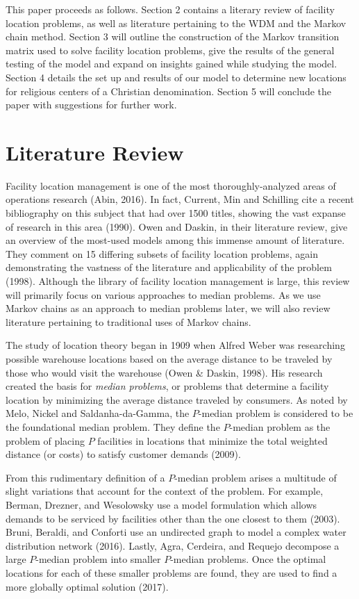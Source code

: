 \documentclass[twoside,twocolumn]{article}
\begin{document}
This paper proceeds as follows.
Section 2 contains a literary review of facility location problems, as well as literature pertaining to the WDM and the Markov chain method.
Section 3 will outline the construction of the Markov transition matrix used to solve facility location problems, give the results of the general testing of the model and expand on insights gained while studying the model.
Section 4 details the set up and results of our model to determine new locations for religious centers of a Christian denomination.
Section 5 will conclude the paper with suggestions for further work.

\section{Literature Review}

Facility location management is one of the most thoroughly-analyzed areas of operations research (Abin, 2016).
In fact, Current, Min and Schilling cite a recent bibliography on this subject that had over 1500 titles, showing the vast expanse of research in this area (1990).
Owen and Daskin, in their literature review, give an overview of the most-used models among this immense amount of literature.
They comment on 15 differing subsets of facility location problems, again demonstrating the vastness of the literature and applicability of the problem (1998).
Although the library of facility location management is large, this review will primarily focus on various approaches to median problems.
As we use Markov chains as an approach to median problems later, we will also review literature pertaining to traditional uses of Markov chains.

The study of location theory began in 1909 when Alfred Weber was researching possible warehouse locations based on the average distance to be traveled by those who would visit the warehouse (Owen \& Daskin, 1998).
His research created the basis for {\em median problems}, or problems that determine a facility location by minimizing the average distance traveled by consumers.
As noted by Melo, Nickel and Saldanha-da-Gamma, the $P$-median problem is considered to be the foundational median problem.
They define the $P$-median problem as the problem of placing $P$ facilities in locations that minimize the total weighted distance (or costs) to satisfy customer demands (2009).

From this rudimentary definition of a $P$-median problem arises a multitude of slight variations that account for the context of the problem.
For example, Berman, Drezner, and Wesolowsky use a model formulation which allows demands to be serviced by facilities other than the one closest to them (2003).
Bruni, Beraldi, and Conforti use an undirected graph to model a complex water distribution network (2016).
Lastly, Agra, Cerdeira, and Requejo decompose a large $P$-median problem into smaller $P$-median problems.
Once the optimal locations for each of these smaller problems are found, they are used to find a more globally optimal solution (2017).
\end{document}
